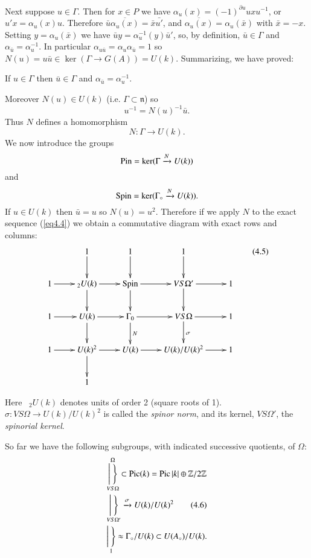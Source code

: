  Next suppose $ u \in \Gamma$. Then for $x \in P$ we have $\alpha_u(x)
 = (-1)^{\partial u} uxu^{-1}$, or $u'x = \alpha_u (x)u$. Therefore
 $\bar{u}\overline{\alpha_u(x)} = \bar{x} \bar{u'}$, and
 $\overline{\alpha_u(x)} = \alpha_u (\bar{x})$ with $\bar{x}
 =-x$. Setting $y = \alpha_u(\bar{x})$ we have $\bar{u}y =
 \alpha^{-1}_u(y) \bar{u}'$, so, by definition, $\bar{u}\in \Gamma$
 and $\alpha_{\bar{u}} = \alpha^{-1}_u$. In particular
 $\alpha_{u\bar{u}} = \alpha_u\alpha_{\bar{u}} = 1$ so $N(u) =
 u\bar{u}\in \ker (\Gamma \to G(A)) = U(k)$. Summarizing, we
 have proved: 
 
If $u \in \Gamma$ then $\bar{u}\in \Gamma$ and $\alpha_{\bar{u}} =
\alpha^{-1}_u$. 
 
Moreover $N(u) \in U(k)$ (i.e. $\Gamma\subset \mathfrak{n}$) so 
 $$
 u^{-1} = N(u)^{-1}\bar{u}. 
 $$
 Thus $N$ defines a homomorphism 
 $$
 N : \Gamma \to U(k). 
 $$
 We now introduce the groups 
 $$
{\rm Pin} = \ker(\Gamma \xrightarrow{N}U(k))
 $$
 and\pageoriginale 
 $$
 {\rm Spin} = \ker (\Gamma_\circ \xrightarrow {N}U(k)). 
 $$
 If $u \in U(k)$ then $\bar{u} = u$ so $N(u) = u^2$. Therefore if we
 apply $N$ to the exact sequence (\ref{eq4.4}) we obtain a commutative
 diagram with exact rows and columns: 
\[
\xymatrix{
& 1 \ar[d] & 1 \ar[d] & 1 \ar[d] & \\
1 \ar[r] & {}_2U(k) \ar[r] \ar[d] & {\rm Spin} \ar[d] \ar[r] & V S \Omega'
\ar[r] \ar[d] & 1 \\
1 \ar[r] & U(k) \ar[r] \ar[d] & \Gamma_0 \ar[r] \ar[d]^N & VS \Omega
\ar[r] \ar[d]^{\sigma} & 1\\
1 \ar[r] & U(k)^2 \ar[r] \ar[d] & U(k) \ar[r] & U(k)/ U(k)^2 \ar[r] &
1\\
& 1 & &  
}\tag{4.5}\label{eq4.5}
\]

Here  \, ${}_{2}U(k)$ denotes units of order 2 (square roots of
1). $\sigma:VS \Omega \to U(k)/ U(k)^2$ is called the \textit{spinor
  norm}, and its kernel, $VS \Omega'$, the \textit{spinorial kernel}. 
 
So far we have the following subgroups, with indicated successive
quotients, of $\Omega$: 
\begin{align*}
 & \overset{\Omega}{\underset{V S \Omega}{\Bigg| \; \Bigg \}}} \subset
  \operatorname{Pic} (k) = \operatorname{Pic} |k| \oplus \mathbb{Z} / 2 \mathbb{Z}\\ 
 & {\underset{V S \Omega'}{\Bigg| \; \Bigg \}}} \xrightarrow{\sigma} U(k)
  / U(k)^2 \tag{4.6}\label{eq4.6}\\ 
 &{\underset{1}{\Bigg| \; \Bigg \}}} \approx \Gamma_\circ / U(k) \subset
  U(A_\circ) / U(k). 
\end{align*}\pageoriginale

